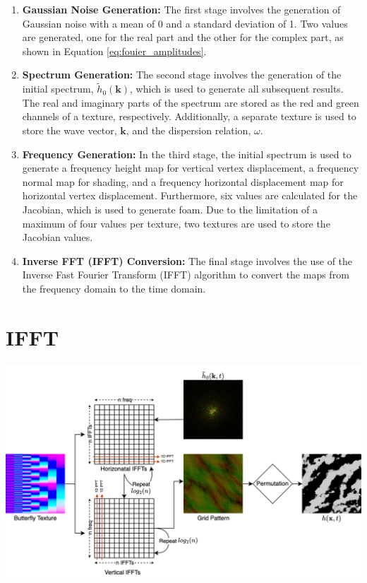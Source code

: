 \begin{enumerate}
    \item \textbf{Gaussian Noise Generation:} The first stage involves the generation of Gaussian noise with a mean of 0 and a standard deviation of 1. Two values are generated, one for the real part and the other for the complex part, as shown in Equation \ref{eq:fouier_amplitudes}.
    \item \textbf{Spectrum Generation:} The second stage involves the generation of the initial spectrum, $\tilde{h}_0(\mathbf{k})$, which is used to generate all subsequent results. The real and imaginary parts of the spectrum are stored as the red and green channels of a texture, respectively. Additionally, a separate texture is used to store the wave vector, $\mathbf{k}$, and the dispersion relation, $\omega$.
    \item \textbf{Frequency Generation:} In the third stage, the initial spectrum is used to generate a frequency height map for vertical vertex displacement, a frequency normal map for shading, and a frequency horizontal displacement map for horizontal vertex displacement. Furthermore, six values are calculated for the Jacobian, which is used to generate foam. Due to the limitation of a maximum of four values per texture, two textures are used to store the Jacobian values.
    \item \textbf{Inverse FFT (IFFT) Conversion:} The final stage involves the use of the Inverse Fast Fourier Transform (IFFT) algorithm to convert the maps from the frequency domain to the time domain.
\end{enumerate}

\section{IFFT}

\begin{minipage}{1\textwidth}
    \centering
    \includegraphics[width=1\textwidth]{"images/ifft_algorithm.png"}
    \label{fig:ifft_algorithm}
\end{minipage}

